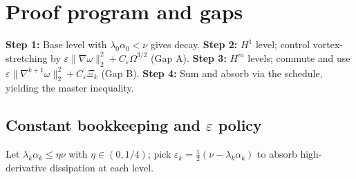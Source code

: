 \section{Proof program and gaps}
\textbf{Step 1:} Base level with $\lambda_0\alpha_0<\nu$ gives decay. 
\textbf{Step 2:} $H^1$ level; control vortex-stretching by $\varepsilon\|\nabla\omega\|_2^2+C_\varepsilon\Omega^{3/2}$ (Gap A).
\textbf{Step 3:} $H^m$ levels; commute and use $\varepsilon\|\nabla^{k+1}\omega\|_2^2+C_\varepsilon\Xi_k$ (Gap B).
\textbf{Step 4:} Sum and absorb via the schedule, yielding the master inequality.
\subsection*{Constant bookkeeping and $\varepsilon$ policy}
Let $\lambda_k\alpha_k\le \eta\nu$ with $\eta\in(0,1/4)$; pick $\varepsilon_k=\tfrac12(\nu-\lambda_k\alpha_k)$ to absorb high-derivative dissipation at each level.
